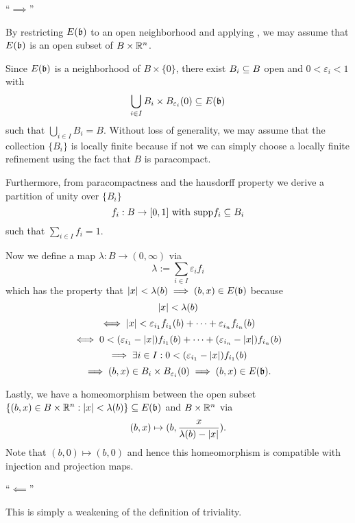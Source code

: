 \begin{myproof}
    ``$\implies$''

    By restricting $E(\mathfrak{b})$ to an open neighborhood and applying ,
    we may assume that $E(\mathfrak{b})$ is an open subset of $B \times \mathbb{R}^n$.

    Since $E(\mathfrak{b})$ is a neighborhood of $B \times \{0\}$, there exist $B_i \subseteq{} B$ open and $0 < \varepsilon_i < 1$ with
    \[ \bigcup_{i \in I } B_i \times \ball[\varepsilon_i] \sub E(\bb)\]
    such that $\bigcup_{i \in I} B_i = B$.
    Without loss of generality, we may assume that the collection $\{B_i\}$ is locally finite because if not
    we can simply choose a locally finite refinement using the fact that $B$ is paracompact.

    Furthermore, from paracompactness and the hausdorff property we derive a partition of unity over $\{B_i\}$
    \[ f_i: B \to [0, 1] \text{ with } \text{supp}{f_i} \subseteq{} B_i\]
    such that $\sum_{i \in I}f_i = 1$.
    
    Now we define a map $\lambda: B \to (0, \infty)$ via
    \[ \lambda := \sum_{i \in I} \varepsilon_i f_i \]
    which has the property that $\vert{} x \vert{} < \lambda(b) \implies (b, x) \in E(\mathfrak{b})$ because
    \[ \vert{} x \vert{} < \lambda(b) \]
    \[ \iff  \vert{} x \vert{} < \varepsilon_{i_1} f_{i_1}(b) + \cdots + \varepsilon_{i_n} f_{i_n}(b) \]
    \[ \iff 0 < (\varepsilon_{i_1} - \vert{} x \vert{}) f_{i_1}(b) + \cdots + (\varepsilon_{i_n} - \vert{} x \vert{}) f_{i_n}(b) \]
    \[ \implies \exists i \in I: 0 < (\varepsilon_{i_1} - \vert{} x \vert{}) f_{i_1}(b) \]
    \[ \implies (b, x) \in B_i \times \ball[\varepsilon_i]  \implies (b, x) \in E(\bb). \]

    Lastly, we have a homeomorphism between the open subset $\{(b, x) \in B \times \mathbb{R}^n:\vert{} x \vert{} < \lambda(b)\} \subseteq{} E(\mathfrak{b})$ and $B \times \mathbb{R}^n$ via
    \[ (b, x) \mapsto (b, \frac{x}{\lambda(b) - \vert{} x \vert{}}). \]
    Note that $(b, 0) \mapsto (b, 0)$ and hence this homeomorphism is compatible with injection and projection maps.

    ``$\impliedby$''

    This is simply a weakening of the definition of triviality. 
\end{myproof}